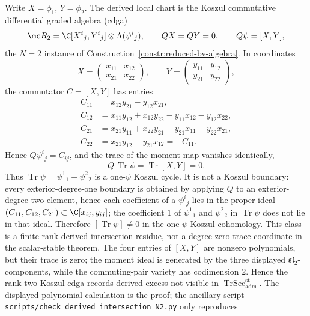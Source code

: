 \documentclass[11pt]{memoir}
\begin{document}
\begin{ex}[Two Dirac branes, generic commuting pair, \(N=2\)]
  Write \(X=\phi_1\), \(Y=\phi_2\).  The derived local chart is the
  Koszul commutative differential graded algebra (cdga)
	  \[
	    \mc R_2=\C[X^i{}_j,Y^i{}_j]\otimes\Lambda(\psi^i{}_j),
	    \qquad
	    QX=QY=0,\qquad Q\psi=[X,Y],
	  \]
	  the \(N=2\) instance of Construction~\ref{constr:reduced-bv-algebra}.
	  In coordinates
	  \[
	    X=\begin{pmatrix}x_{11}&x_{12}\\ x_{21}&x_{22}\end{pmatrix},
	    \qquad
	    Y=\begin{pmatrix}y_{11}&y_{12}\\ y_{21}&y_{22}\end{pmatrix},
	  \]
	  the commutator \(C=[X,Y]\) has entries
	  \[
	  \begin{aligned}
	    C_{11}&=x_{12}y_{21}-y_{12}x_{21},\\
	    C_{12}&=x_{11}y_{12}+x_{12}y_{22}
	      -y_{11}x_{12}-y_{12}x_{22},\\
	    C_{21}&=x_{21}y_{11}+x_{22}y_{21}
	      -y_{21}x_{11}-y_{22}x_{21},\\
	    C_{22}&=x_{21}y_{12}-y_{21}x_{12}=-C_{11}.
	  \end{aligned}
	  \]
	  Hence \(Q\psi^i{}_j=C_{ij}\), and the trace of the moment map
	  vanishes identically,
	  \[
	    Q\,\operatorname{Tr}\psi=\operatorname{Tr}[X,Y]=0.
	  \]
	  Thus \(\operatorname{Tr}\psi=\psi^1{}_1+\psi^2{}_2\) is a
	  one-\(\psi\) Koszul cycle.  It is not a Koszul boundary: every
	  exterior-degree-one boundary is obtained by applying \(Q\) to an
	  exterior-degree-two element, hence each coefficient of a
	  \(\psi^i{}_j\) lies in the proper ideal
	  \((C_{11},C_{12},C_{21})\subset\C[x_{ij},y_{ij}]\); the coefficient
	  \(1\) of \(\psi^1{}_1\) and \(\psi^2{}_2\) in
	  \(\operatorname{Tr}\psi\) does not lie in that ideal.  Therefore
	  \([\operatorname{Tr}\psi]\neq0\) in the one-\(\psi\) Koszul
	  cohomology.  This class is a finite-rank derived-intersection
	  residue, not a degree-zero trace coordinate in the scalar-stable
	  theorem.  The four entries of \([X,Y]\) are nonzero polynomials, but
	  their trace is zero; the moment ideal is generated by the three
	  displayed \(\mathfrak{sl}_2\)-components, while the commuting-pair
	  variety has codimension \(2\).  Hence the rank-two Koszul cdga
	  records derived excess not visible in
	  \(\operatorname{TrSec}^{\mathrm{st}}_{\mathrm{adm}}\).  The displayed
	  polynomial calculation is the proof; the ancillary script
	  \texttt{scripts/check\_derived\_intersection\_N2.py} only reproduces

\end{ex}
\end{document}
